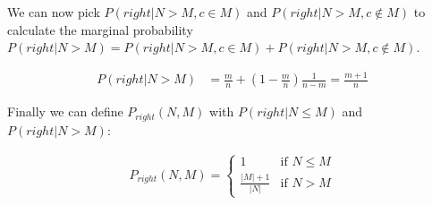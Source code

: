 We can now pick $P(right | N > M, c \in M)$ and $P(right | N > M, c \notin M)$ to 
calculate the marginal probability $P(right | N > M) = P(right | N > M, c \in M) + P(right | N > M, c \notin M)$.

\begin{align*}
P(right | N > M) &= \frac{m}{n} + (1 - \frac{m}{n}) \frac{1}{n - m} = \frac{m + 1}{n}
\end{align*}

Finally we can define $P_{right}(N, M)$ with $P(right | N \leq M)$ and $P(right | N > M)$:

\begin{align*}
P_{right}(N, M) = 
\begin{cases} 
1             & \mbox{if } N \leq M \\ 
\frac{|M|+1}{|N|} & \mbox{if } N > M
\end{cases}
\end{align*}
